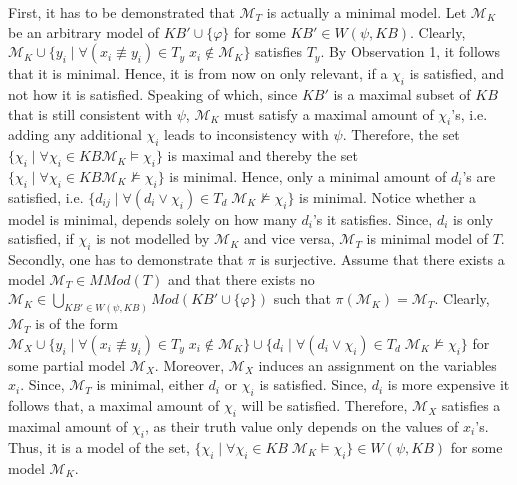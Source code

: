 \documentclass[11pt,a4paper]{article}
\newcommand{\nmodels}{\not\models}
\begin{document}
\begin{enumerate}
\begin{itemize}
First, it has to be demonstrated that $\mathcal{M}_T$ is actually a minimal model. Let $\mathcal{M}_K$ be an arbitrary model of $\mathit{KB}' \cup \{\varphi\}$  for some $\mathit{KB}' \in W(\psi, \mathit{KB})$. Clearly, $\mathcal{M}_K \cup \{y_i \mid \forall (x_i \not\equiv y_i) \in T_y \; x_i \notin \mathcal{M}_K\}$ satisfies $T_y$. By Observation 1, it follows that it is minimal. Hence, it is from now on only relevant, if a $\chi_i$ is satisfied, and not how it is satisfied. Speaking of which, since $\mathit{KB}'$ is a maximal subset of $\mathit{KB}$ that is still consistent with $\psi$, $\mathcal{M}_K$ must satisfy a maximal amount of $\chi_i$'s, i.e. adding any additional $\chi_i$ leads to inconsistency with $\psi$. Therefore, the set $\{\chi_i \mid \forall \chi_i \in \mathit{KB} \mathcal{M}_K \models \chi_i\}$ is maximal and thereby the set $\{\chi_i \mid \forall \chi_i \in \mathit{KB}  \mathcal{M}_K \nmodels \chi_i\}$ is minimal. Hence, only a minimal amount of $d_i$'s are satisfied, i.e. $ \{ d_{ij} \mid \forall (d_i \lor \chi_i) \in T_d  \; \mathcal{M}_K \nmodels \chi_i\}$ is minimal. Notice whether a model is minimal, depends solely on how many $d_i$'s it satisfies. Since, $d_i$ is only satisfied, if $\chi_i$ is not modelled by $\mathcal{M}_K$ and vice versa, $\mathcal{M}_T$ is minimal model of $T$. \\

 
 
Secondly, one has to demonstrate that $\pi$ is surjective. Assume that there exists a model $\mathcal{M}_T \in \mathit{MMod}(T)$ and that there exists no $\mathcal{M}_K \in \bigcup_{\mathit{KB}' \in W(\psi, \mathit{KB})} Mod(\mathit{KB}' \cup \{\varphi\})$ such that $\pi(\mathcal{M}_K)=\mathcal{M}_T$. Clearly, $\mathcal{M}_T$ is of the form $\mathcal{M}_X \cup \{y_i \mid \forall (x_i \not\equiv y_i) \in T_y \; x_i \notin \mathcal{M}_K\} \cup
 \{ d_i \mid \forall (d_i \lor \chi_i) \in T_d \; \mathcal{M}_K \nmodels \chi_i\}$ for some partial model $\mathcal{M}_X$. 
 Moreover, $\mathcal{M}_X$ induces an assignment on the variables $x_i$.
Since, $\mathcal{M}_T$ is minimal, either $d_i$ or $\chi_i$ is satisfied. Since, $d_i$ is more expensive it follows that, a maximal amount of $\chi_i$ will be satisfied.
Therefore, $\mathcal{M}_X$ satisfies a maximal amount of $\chi_i$, as their truth value only depends on the values of $x_i$'s. Thus, it is a model of the set, $\{ \chi_i \mid \forall \chi_i \in \mathit{KB} \; \mathcal{M}_K \models \chi_i \} \in W(\psi, \mathit{KB})$ for some model $\mathcal{M}_K$.\\



\end{itemize}
\end{enumerate}
\end{document}
